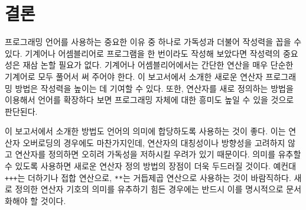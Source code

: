 \documentclass[titlepage]{pnureport}
\begin{document}
\chapter{결론}
\label{ch:concl}

프로그래밍 언어를 사용하는 중요한 이유 중 하나로 가독성과 더불어 작성력을 꼽을 수 있다. 기계어나 어셈블리어로 프로그램을 한 번이라도 작성해 보았다면 작성력의 중요성은 재삼 논할 필요가 없다. 기계어나 어셈블리어에서는 간단한 연산을 매우 단순한 기계어로 모두 풀어서 써 주어야 한다. 이 보고서에서 소개한 새로운 연산자 프로그래밍 방법은 작성력을 높이는 데 기여할 수 있다. 또한, 연산자를 새로 정의하는 방법을 이용해서 언어를 확장하다 보면 프로그래밍 자체에 대한 흥미도 높일 수 있을 것으로 판단된다.

이 보고서에서 소개한 방법도 언어의 의미에 합당하도록 사용하는 것이 좋다. 이는 연산자 오버로딩의 경우에도 마찬가지인데, 연산자의 대칭성이나 방향성을 고려하지 않고 연산자를 정의하면 오히려 가독성을 저하시킬 우려가 있기 때문이다. 의미를 유추할 수 있도록 사용하면 새로운 연산자 정의 방법의 장점이 더욱 두드러질 것이다. 예컨대 \verb|+++|는 더하기나 접합 연산으로, \verb|**|는 거듭제곱 연산으로 사용하는 것이 바람직하다. 새로 정의한 연산자 기호의 의미를 유추하기 힘든 경우에는 반드시 이를 명시적으로 문서화해야 할 것이다.





\end{document}
